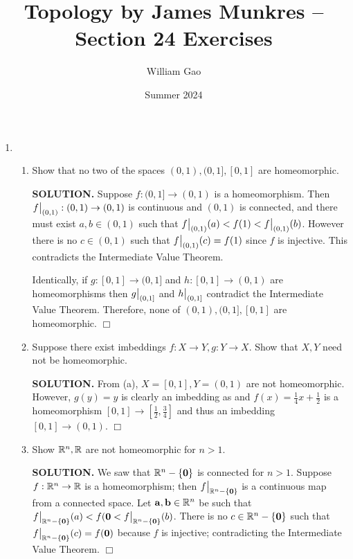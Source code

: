 \documentclass{article}
\title{Topology by James Munkres -- Section 24 Exercises}
\author{William Gao}
\date{Summer 2024}
\begin{document}
\maketitle

\begin{enumerate}
    \item \begin{enumerate}
        \item Show that no two of the spaces $(0, 1), (0, 1], [0, 1]$ are homeomorphic.

        {\bf SOLUTION.} Suppose $f: (0, 1] \rightarrow (0, 1)$ is a homeomorphism. Then $\restr{f}{(0, 1)}: (0, 1) \rightarrow (0, 1)$ is continuous and $(0, 1)$ is connected, and there must exist $a, b \in (0, 1)$ such that $\restr{f}{(0, 1)}(a) < f(1) < \restr{f}{(0, 1)}(b)$. However there is no $c \in (0, 1)$ such that $\restr{f}{(0, 1)}(c) = f(1)$ since $f$ is injective. This contradicts the Intermediate Value Theorem.

        Identically, if $g: [0, 1] \rightarrow (0, 1]$ and $h: [0, 1] \rightarrow (0, 1)$ are homeomorphisms then $\restr{g}{(0, 1]}$ and $\restr{h}{(0, 1]}$ contradict the Intermediate Value Theorem. Therefore, none of $(0, 1), (0, 1], [0, 1]$ are homeomorphic. $\Box$

        \item Suppose there exist imbeddings $f: X \rightarrow Y, g: Y \rightarrow X$. Show that $X, Y$ need not be homeomorphic.

        {\bf SOLUTION.} From (a), $X = [0, 1], Y = (0, 1)$ are not homeomorphic. However, $g(y) = y$ is clearly an imbedding as and $f(x) = \frac14 x + \frac12$ is a homeomorphism $[0, 1] \rightarrow [\frac12, \frac34]$ and thus an imbedding $[0, 1] \rightarrow (0, 1)$. $\Box$ 

        \item Show $\mathbb{R}^n, \mathbb{R}$ are not homeomorphic for $n > 1$.

        {\bf SOLUTION.} We saw that $\mathbb{R}^n - \{\mathbf{0}\}$ is connected for $n > 1$. Suppose $f: \mathbb{R}^n \rightarrow \mathbb{R}$ is a homeomorphism; then $\restr{f}{\reals^n - \{\mathbf{0}\}}$ is a continuous map from a connected space. Let $\mathbf{a}, \mathbf{b} \in \mathbb{R}^n$ be such that $\restr{f}{\reals^n - \{\mathbf{0}\}}(a) < f(\mathbf{0} < \restr{f}{\reals^n - \{\mathbf{0}\}}(b)$. There is no $c \in \mathbb{R}^n - \{\mathbf{0}\}$ such that $\restr{f}{\reals^n - \{\mathbf{0}\}}(c) = f(\mathbf{0})$ because $f$ is injective; contradicting the Intermediate Value Theorem. $\Box$
    \end{enumerate}


\end{enumerate}
\end{document}
